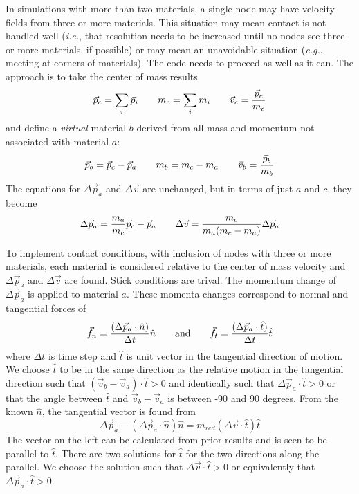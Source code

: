 \documentclass[11pt]{article}
\begin{document}
In simulations with more than two materials, a single node may have velocity fields from three or more materials. This situation may mean contact is not handled well ({\em i.e.}, that resolution needs to be increased until no nodes see three or more materials, if possible) or may mean an unavoidable situation ({\em e.g.}, meeting at corners of materials). The code needs to proceed as well as it can. The approach is to take the center of mass results
\begin{equation}
     \vec p_c = \sum_i \vec p_i  \qquad m_c =  \sum_i m_i \qquad    \vec v_c = {\vec p_c\over m_c}
\end{equation}
and define a {\em virtual} material $b$ derived from all mass and momentum not associated with material $a$:
\begin{equation}
     \vec p_b = \vec p_c-\vec p_a  \qquad m_b = m_c - m_a \qquad    \vec v_b = {\vec p_b\over m_b}
\end{equation}
The equations for $\Delta \vec p_a$ and $\Delta \vec v$ are unchanged, but in terms of just $a$ and $c$, they become
\begin{equation}
    \Delta \vec p_a = {m_a\over m_c}\vec p_c-\vec p_a  \qquad \Delta \vec v = {m_c\over m_a(m_c-m_a)}\Delta \vec p_a
\end{equation}

To implement contact conditions, with inclusion of nodes with three or more materials, each material is considered relative to the center of mass velocity and $\Delta \vec p_a$ and $\Delta \vec v$ are found. Stick conditions are trival. The momentum change of $\Delta \vec p_a$ is applied to material $a$. These momenta changes correspond to normal and tangential forces of
\begin{equation}
         \vec f_n = {(\Delta \vec p_a\cdot \hat n)\over \Delta t}\hat n \qquad {\rm and}\qquad \vec f_t={(\Delta \vec p_a\cdot \hat t)\over \Delta t}\hat t
\end{equation}
where $\Delta t$ is time step and $\hat t$ is unit vector in the tangential direction of motion. We choose $\hat t$ to be in the same direction as the relative motion in the tangential direction such that $(\vec v_b-\vec v_a)\cdot \hat t>0$ and identically such that $\Delta \vec p_a\cdot \hat t>0$ or that the angle between $\hat t$ and $\vec v_b-\vec v_a$ is between -90 and 90 degrees. From the known $\hat n$, the tangential vector is found from
\begin{equation}
          \Delta\vec p_a - (\Delta \vec p_a\cdot \hat n)\hat n = m_{red}(\Delta \vec v\cdot \hat t)\hat t
\end{equation}
The vector on the left can be calculated from prior results and is seen to be parallel to $\hat t$. There are two solutions for $\hat t$ for the two directions along the parallel. We choose the solution such that  $\Delta \vec v\cdot \hat t>0$ or equivalently that $\Delta \vec p_a\cdot \hat t>0$.
\end{document}

